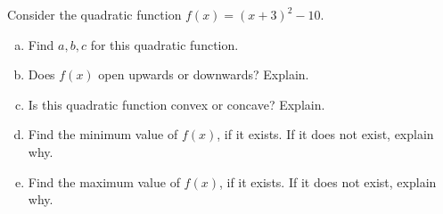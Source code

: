 \documentclass[11pt,letterpaper]{article}
\begin{document}
\newpage



 Consider the quadratic function $f(x)= (x + 3)^2 - 10$.
	\begin{enumerate}[(a)]
	\item Find $a, b, c$ for this quadratic function.
	\item Does $f(x)$ open upwards or downwards? Explain.
	\item Is this quadratic function convex or concave? Explain. 
	\item Find the minimum value of $f(x)$, if it exists. If it does not exist, explain why.  
	\item Find the maximum value of $f(x)$, if it exists. If it does not exist, explain why. 
	\end{enumerate}
\end{document}
